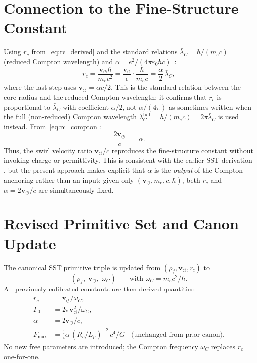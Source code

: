 \documentclass[11pt,a4paper]{article}
\newcommand{\rc}{r_c}
\newcommand{\vswirl}{\mathbf{v}_{\scriptscriptstyle\boldsymbol{\circlearrowleft}}}
\newcommand{\rhof}{\rho_{\!f}}
\newcommand{\GammaZ}{\Gamma_0}
\newcommand{\omC}{\omega_C}
\newcommand{\lambdaC}{\lambda_C}
\begin{document}
\section{Connection to the Fine-Structure Constant}

Using $\rc$ from~\eqref{eq:rc_derived} and the standard relations
$\bar\lambdaC=\hbar/(m_e c)$ (reduced Compton wavelength) and
$\alpha=e^2/(4\pi\varepsilon_0\hbar c)$~\cite{MohrTaylor2016}:
\begin{equation}
  \rc = \frac{\vswirl\hbar}{m_e c^2}
      = \frac{\vswirl}{c}\cdot\frac{\hbar}{m_e c}
      = \frac{\alpha}{2}\,\bar\lambdaC,
  \label{eq:rc_compton}
\end{equation}
where the last step uses $\vswirl=\alpha c/2$.  This is the standard
relation between the core radius and the reduced Compton wavelength;
it confirms that $\rc$ is proportional to $\bar\lambdaC$ with
coefficient $\alpha/2$, not $\alpha/(4\pi)$ as sometimes
written when the full (non-reduced) Compton wavelength
$\lambdaC^{\mathrm{full}}=h/(m_ec)=2\pi\bar\lambdaC$ is used
instead.  From~\eqref{eq:rc_compton}:
\begin{equation}
  \frac{2\vswirl}{c} \;=\; \alpha.
  \label{eq:alpha_emergent}
\end{equation}
Thus, the swirl velocity ratio $\vswirl/c$ reproduces the
fine-structure constant without invoking charge or permittivity.
This is consistent with the earlier SST derivation
\cite{IskandaraniVAMCore2025}, but the present approach makes
explicit that $\alpha$ is the \emph{output} of the Compton
anchoring rather than an input: given only
$(\vswirl,m_e,c,\hbar)$, both $\rc$
and $\alpha=2\vswirl/c$ are simultaneously fixed.

\section{Revised Primitive Set and Canon Update}

The canonical SST primitive triple is updated from
$(\rhof,\vswirl,\rc)$ to
\begin{equation}
  \boxed{
    (\rhof,\;\vswirl,\;\omC)
    \qquad
    \text{with } \omC = m_e c^2/\hbar.
  }
  \label{eq:new_primitives}
\end{equation}
All previously calibrated constants are then derived quantities:
\begin{align}
  \rc      &= \vswirl/\omC,                              \label{eq:rc_canon}\\
  \GammaZ  &= 2\pi\vswirl^2/\omC,                       \label{eq:G0_canon}\\
  \alpha   &= 2\vswirl/c,                                \label{eq:alpha_canon}\\
  F_{\max} &= \tfrac{1}{4}\alpha\,(R_c/L_p)^{-2}\,c^4/G \quad
             \text{(unchanged from prior canon)}.
\end{align}
No new free parameters are introduced; the
Compton frequency $\omC$ replaces $\rc$ one-for-one.
\end{document}
